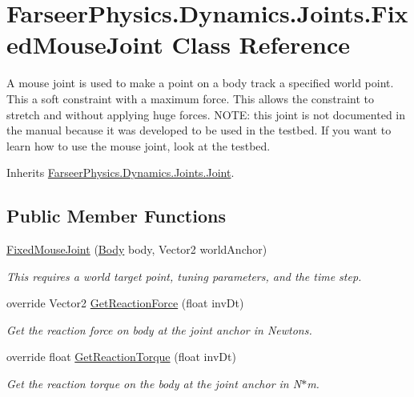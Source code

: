 \hypertarget{class_farseer_physics_1_1_dynamics_1_1_joints_1_1_fixed_mouse_joint}{\section{Farseer\+Physics.\+Dynamics.\+Joints.\+Fixed\+Mouse\+Joint Class Reference}
\label{class_farseer_physics_1_1_dynamics_1_1_joints_1_1_fixed_mouse_joint}
}


A mouse joint is used to make a point on a body track a specified world point. This a soft constraint with a maximum force. This allows the constraint to stretch and without applying huge forces. N\+O\+T\+E\+: this joint is not documented in the manual because it was developed to be used in the testbed. If you want to learn how to use the mouse joint, look at the testbed.  




Inherits \hyperlink{class_farseer_physics_1_1_dynamics_1_1_joints_1_1_joint}{Farseer\+Physics.\+Dynamics.\+Joints.\+Joint}.

\subsection*{Public Member Functions}
\begin{DoxyCompactItemize}
\item 
\hyperlink{class_farseer_physics_1_1_dynamics_1_1_joints_1_1_fixed_mouse_joint_ad8330f7c9e36fb0f965ce4e651de519f}{Fixed\+Mouse\+Joint} (\hyperlink{class_farseer_physics_1_1_dynamics_1_1_body}{Body} body, Vector2 world\+Anchor)
\begin{DoxyCompactList}\small\item\em This requires a world target point, tuning parameters, and the time step. \end{DoxyCompactList}\item 
override Vector2 \hyperlink{class_farseer_physics_1_1_dynamics_1_1_joints_1_1_fixed_mouse_joint_acfb73894a3d9f72003b536878e2b59e8}{Get\+Reaction\+Force} (float inv\+Dt)
\begin{DoxyCompactList}\small\item\em Get the reaction force on body at the joint anchor in Newtons. \end{DoxyCompactList}\item 
override float \hyperlink{class_farseer_physics_1_1_dynamics_1_1_joints_1_1_fixed_mouse_joint_a2becffede0c5bba84ab601e12c492bc1}{Get\+Reaction\+Torque} (float inv\+Dt)
\begin{DoxyCompactList}\small\item\em Get the reaction torque on the body at the joint anchor in N$\ast$m. \end{DoxyCompactList}\end{DoxyCompactItemize}
